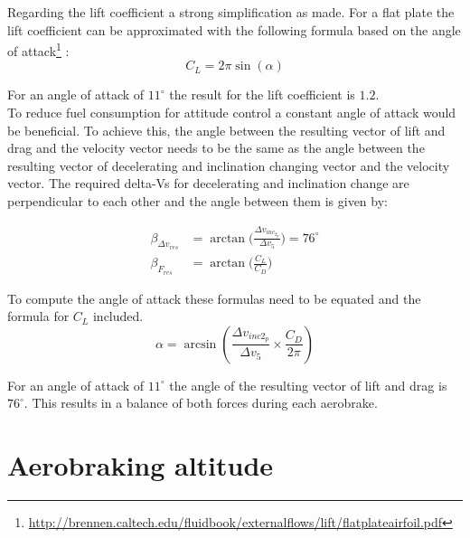 Regarding the lift coefficient a strong simplification as made. For a flat plate the lift coefficient can be approximated with the following formula based on the angle of attack\footnote{\url{http://brennen.caltech.edu/fluidbook/externalflows/lift/flatplateairfoil.pdf}} :
\begin{equation}
	C_L = 2\pi\sin(\alpha)
\end{equation}

For an angle of attack of $11^\circ$ the result for the lift coefficient is $1.2$.\\

To reduce fuel consumption for attitude control a constant angle of attack would be beneficial. To achieve this, the angle between the resulting vector of lift and drag and the velocity vector needs to be the same as the angle between the resulting vector of decelerating and inclination changing vector and the velocity vector. The required delta-Vs for decelerating and inclination change are perpendicular to each other and the angle between them is given by:

\begin{align}
	\beta_{\Delta v_{res}}&=\arctan\bigg(\frac{\Delta v_{inc_{2_p}}}{\Delta v_5}\bigg) = 76^\circ\\
	\beta_{F_{res}} &= \arctan\bigg(\frac{C_L}{C_D}\bigg)
\end{align}

To compute the angle of attack these formulas need to be equated and the formula for $C_L$ included.\\

\begin{equation}
	\alpha = \arcsin(\frac{\Delta v_{inc2_p}}{\Delta v_5}\times \frac{C_D}{2\pi})
\end{equation}

For an angle of attack of $11^\circ$ the angle of the resulting vector of lift and drag is $76^\circ$. This results in a balance of both forces during each aerobrake.

\section{Aerobraking altitude}

